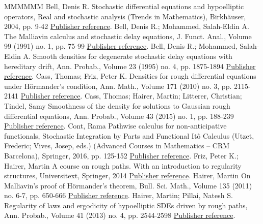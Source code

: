 \documentclass[11pt]{article}
\theoremstyle{definition}
\numberwithin{equation}{section}
\numberwithin{figure}{section}
\numberwithin{table}{section}
\begin{document}
\begin{thebibliography}{MMMMMM}
 Bell, Denis R. Stochastic differential equations and hypoelliptic operators, Real and stochastic analysis (Trends in Mathematics), Birkhäuser, 2004, pp. 9-42 \href{https://ahl.centre-mersenne.org/item/AHL_2020__3__1023_0/#Bell}{Publisher reference}.
 Bell, Denis R.; Mohammed, Salah-Eldin A. The Malliavin calculus and stochastic delay equations, J. Funct. Anal., Volume 99 (1991) no. 1, pp. 75-99 \href{https://ahl.centre-mersenne.org/item/AHL_2020__3__1023_0/#BelMo91}{Publisher reference}.
 Bell, Denis R.; Mohammed, Salah-Eldin A. Smooth densities for degenerate stochastic delay equations with hereditary drift, Ann. Probab., Volume 23 (1995) no. 4, pp. 1875-1894 \href{https://ahl.centre-mersenne.org/item/AHL_2020__3__1023_0/#BelMo95}{Publisher reference}.
 Cass, Thomas; Friz, Peter K. Densities for rough differential equations under Hörmander’s condition, Ann. Math., Volume 171 (2010) no. 3, pp. 2115-2141 \href{https://ahl.centre-mersenne.org/item/AHL_2020__3__1023_0/#CT10}{Publisher reference}.
 Cass, Thomas; Hairer, Martin; Litterer, Christian; Tindel, Samy Smoothness of the density for solutions to Gaussian rough differential equations, Ann. Probab., Volume 43 (2015) no. 1, pp. 188-239 \href{https://ahl.centre-mersenne.org/item/AHL_2020__3__1023_0/#CHLT15}{Publisher reference}.
 Cont, Rama Pathwise calculus for non-anticipative functionals, Stochastic Integration by Parts and Functional Itô Calculus (Utzet, Frederic; Vives, Josep, eds.) (Advanced Courses in Mathematics – CRM Barcelona), Springer, 2016, pp. 125-152 \href{https://ahl.centre-mersenne.org/item/AHL_2020__3__1023_0/#bally2016pathwise}{Publisher reference}.
 Friz, Peter K.; Hairer, Martin A course on rough paths. With an introduction to regularity structures, Universitext, Springer, 2014 \href{https://ahl.centre-mersenne.org/item/AHL_2020__3__1023_0/#FH14}{Publisher reference}.
 Hairer, Martin On Malliavin’s proof of Hörmander’s theorem, Bull. Sci. Math., Volume 135 (2011) no. 6-7, pp. 650-666 \href{https://ahl.centre-mersenne.org/item/AHL_2020__3__1023_0/#Hairer11}{Publisher reference}.
 Hairer, Martin; Pillai, Natesh S. Regularity of laws and ergodicity of hypoelliptic SDEs driven by rough paths, Ann. Probab., Volume 41 (2013) no. 4, pp. 2544-2598 \href{https://ahl.centre-mersenne.org/item/AHL_2020__3__1023_0/#HP13}{Publisher reference}.

\end{thebibliography}
\end{document}
